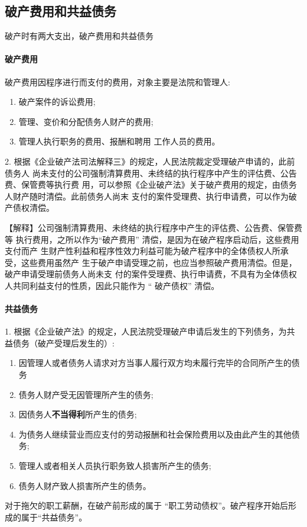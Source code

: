 \documentclass[UTF8,12pt]{ctexart}
\numberwithin{equation}{section} %
\numberwithin{figure}{section}
\numberwithin{table}{section}
\begin{document}
	
	
	\subsection{破产费用和共益债务}
	破产时有两大支出，破产费用和共益债务
	
	\paragraph{破产费用}
	破产费用因程序进行而支付的费用，对象主要是法院和管理人: 
	\begin{enumerate}
		\item 破产案件的诉讼费用;
		
		\item 管理、变价和分配债务人财产的费用;
		
		\item 管理人执行职务的费用、报酬和聘用 工作人员的费用。
	\end{enumerate}
	
	2. 根据《企业破产法司法解释三》的规定，人民法院裁定受理破产申请的，此前债务人 尚未支付的公司强制清算费用、未终结的执行程序中产生的评估费、公告费、保管费等执行费 用，可以参照《企业破产法》关于破产费用的规定，由债务人财产随时清偿。此前债务人尚末 支付的案件受理费、执行申请费，可以作为破产债权清偿。 
	
	【解释】公司强制清算费用、未终结的执行程序中产生的评估费、公告费、保管费等 执行费用，之所以作为“破产费用” 清偿，是因为在破产程序启动后，这些费用支付而产 生财产性利益和程序性效力利益可能为破产程序中的全体债权人所承受，这些费用虽然产 生于破产申请受理之前，也应当参照破产费用清偿。但是，破产申请受理前债务人尚未支 付的案件受理费、执行申请费，不具有为全体债权人共同利益支付的性质，因此只能作为 “ 破产债权” 清偿。
	
	\paragraph{共益债务}
	1. 根据《企业破产法》的规定，人民法院受理破产申请后发生的下列债务，为共益债务（破产受理后发生的）: 
	\begin{enumerate}
		\item 因管理人或者债务人请求对方当事人履行双方均未履行完毕的合同所产生的债务
		
		\item 债务人财产受无因管理所产生的债务;
		
		\item 因债务人\textbf{不当得利}所产生的债务;
		
		\item 为债务人继续营业而应支付的劳动报酬和社会保险费用以及由此产生的其他债务; 
		
		\item 管理人或者相关人员执行职务致人损害所产生的债务;
		
		\item 债务人财产致人损害所产生的债务。
	\end{enumerate}
	对于拖欠的职工薪酬，在破产前形成的属于 “职工劳动债权”。破产程序开始后形成的属于“共益债务”。
	
\end{document}

